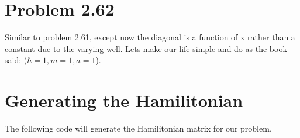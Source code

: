 \documentclass[letterpaper,10pt,english]{jupyterBook}
\begin{document}
\noindent{}


\chapter{Problem 2.62}
\label{\detokenize{2.62:problem-2-62}}\label{\detokenize{2.62::doc}}
\sphinxAtStartPar
Similar to problem 2.61, except now the diagonal is a function of x rather than a constant due to the varying well. Lets make our life simple and do as the book said: (\(\hbar=1, m=1, a=1\)).


\chapter{Generating the Hamilitonian}
\label{\detokenize{2.62:generating-the-hamilitonian}}
\sphinxAtStartPar
The following code will generate the Hamilitonian matrix for our problem.
\end{document}
